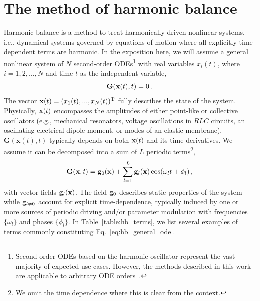 \section{The method of harmonic balance} \label{sec:hb}
Harmonic balance is a method to treat harmonically-driven nonlinear systems, i.e., dynamical systems governed by equations of motion where all explicitly time-dependent terms are harmonic. In the exposition here, we will assume a general nonlinear system of $N$ second-order ODEs\footnote{Second-order ODEs based on the harmonic oscillator represent the vast majority of expected use cases. However, the methods described in this work are applicable to arbitrary ODE orders~\cite{Richards}.} with real variables $x_i(t)$, where $i = 1,2,\ldots,N$ and time $t$ as the independent variable,
\begin{equation} \label{eq:hb_general_ode}
\vb{G}(\vb{x}(t), t)=0\:.
\end{equation}
The vector $\vb{x}(t) = (x_1(t), ..., x_N(t))^{\text T}$ fully describes the state of the system.  Physically, $\vb{x}(t)$ encompasses the amplitudes of either point-like or collective oscillators (e.g., mechanical resonators, voltage oscillations in $RLC$ circuits, an oscillating electrical dipole moment, or modes of an elastic membrane). $\textbf{G}(\textbf{x}(t),t)$ typically depends on both $\vb{x}(t)$ and its time derivatives. We assume it can be decomposed into a sum of $L$ periodic terms\footnote{We omit the time dependence where this is clear from the context.},
\begin{equation} \label{eq:hb_G}
\vb{G}(\vb{x}, t) = \vb{g}_0(\vb{x}) + \sum_{l=1}^L \vb{g}_{l}(\vb{x}) \cos(\omega_l t + \phi_l)\,,
\end{equation}
with vector fields $\vb{g}_l(\vb{x})$.  The field $\vb{g}_0$ describes static properties of the system while $\vb{g}_{l\neq0}$ account for explicit time-dependence, typically induced by one or more sources of periodic driving and/or parameter modulation with frequencies $\{\omega_l\}$ and phases $\{\phi_l\}$. In Table~\ref{table:hb_terms}, we list several examples of terms commonly constituting Eq.~\eqref{eq:hb_general_ode}. 

